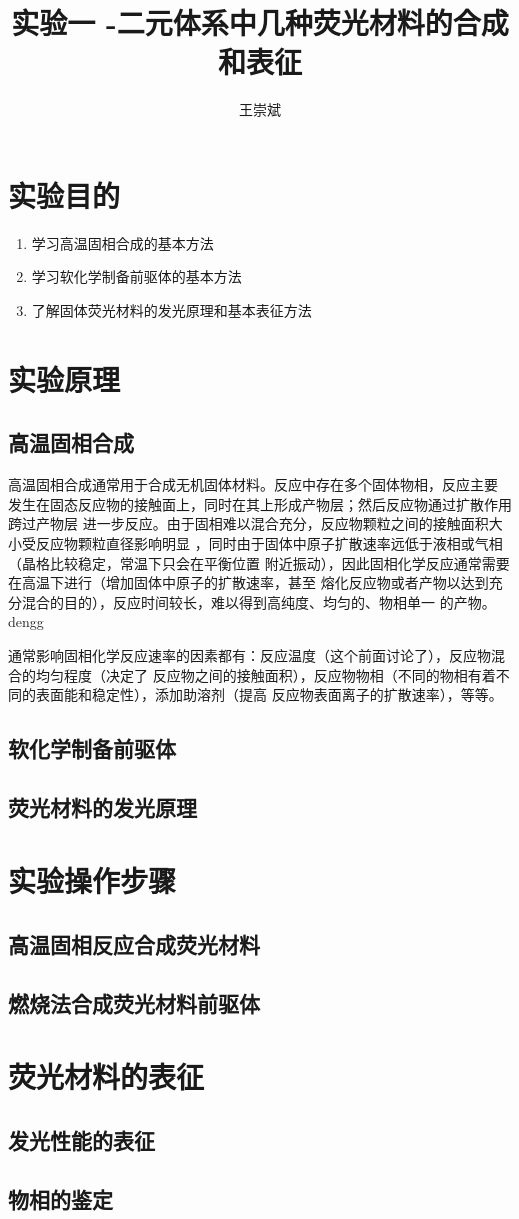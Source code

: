 \documentclass[a4paper,zihao=5,UTF8]{ctexart}
\title{\textbf{实验一 \ce{SrO}-\ce{Al2O3}二元体系中几种荧光材料的合成和表征\cite{inorganic_chemistry_1}}}
\author{王崇斌\;1800011716}
\begin{document}
	\pagestyle{fancy}
	\pagestyle{fancy}
	\chead{}
	\rhead{\today}
	\maketitle
    \thispagestyle{fancy}
	\section{实验目的}
	\begin{enumerate}
		\item 学习高温固相合成的基本方法
		\item 学习软化学制备前驱体的基本方法
		\item 了解固体荧光材料的发光原理和基本表征方法
	\end{enumerate}
	\section{实验原理}
	\subsection{高温固相合成}
	高温固相合成通常用于合成无机固体材料。反应中存在多个固体物相，反应主要
	发生在固态反应物的接触面上，同时在其上形成产物层；然后反应物通过扩散作用跨过产物层
	进一步反应。由于固相难以混合充分，反应物颗粒之间的接触面积大小受反应物颗粒直径影响明显
	，同时由于固体中原子扩散速率远低于液相或气相（晶格比较稳定，常温下只会在平衡位置
	附近振动），因此固相化学反应通常需要在高温下进行（增加固体中原子的扩散速率，甚至
	熔化反应物或者产物以达到充分混合的目的），反应时间较长，难以得到高纯度、均匀的、物相单一
	的产物。dengg
	\par 
	通常影响固相化学反应速率的因素都有：反应温度（这个前面讨论了），反应物混合的均匀程度（决定了
	反应物之间的接触面积），反应物物相（不同的物相有着不同的表面能和稳定性），添加助溶剂（提高
	反应物表面离子的扩散速率），等等。
	\subsection{软化学制备前驱体}
	
	\subsection{荧光材料的发光原理}
	\section{实验操作步骤}
	\subsection{高温固相反应合成荧光材料}
	\subsection{燃烧法合成荧光材料前驱体}
	\section{荧光材料的表征}
	\subsection{发光性能的表征}
	\subsection{物相的鉴定}

	
	
	
\end{document}
